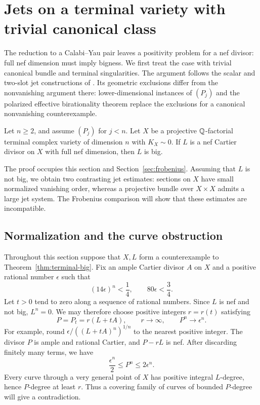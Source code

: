 \section{Jets on a terminal variety with trivial canonical class}
\label{sec:geometry}

The reduction to a Calabi--Yau pair leaves a positivity problem for a
nef divisor: full nef dimension must imply bigness. We first treat the
case with trivial canonical bundle and terminal singularities. The
argument follows the scalar and two-slot jet constructions of
\cite[Sections~7--8]{LA}. Its geometric exclusions differ from the
nonvanishing argument there: lower-dimensional instances of $(P_j)$
and the polarized effective birationality theorem replace the
exclusions for a canonical nonvanishing counterexample.

\begin{theorem}\label{thm:terminal-big}
Let $n\ge2$, and assume $(P_j)$ for $j<n$. Let $X$ be a projective
$\mathbb Q$-factorial terminal complex variety of dimension $n$ with
$K_X\sim0$. If $L$ is a nef Cartier divisor on $X$ with full nef
dimension, then $L$ is big.
\end{theorem}

The proof occupies this section and Section~\ref{sec:frobenius}.
Assuming that $L$ is not big, we obtain two contrasting jet estimates:
sections on $X$ have small normalized vanishing order, whereas a
projective bundle over $X\times X$ admits a large jet system. The
Frobenius comparison will show that these estimates are incompatible.

\subsection{Normalization and the curve obstruction}

Throughout this section suppose that $X,L$ form a counterexample to
Theorem~\ref{thm:terminal-big}. Fix an ample Cartier divisor $A$ on $X$
and a positive rational number $\epsilon$ such that
\begin{equation}\label{j:epsilon}
 (14\epsilon)^n<\frac14,
 \qquad 80\epsilon<\frac34.
\end{equation}
Let $t>0$ tend to zero along a sequence of rational numbers. Since
$L$ is nef and not big, $L^n=0$. We may therefore choose positive
integers $r=r(t)$ satisfying
\begin{equation}\label{eq:scaling}
 P=P_t=r(L+tA),\qquad
 r\longrightarrow\infty,\qquad P^n\longrightarrow\epsilon^n.
\end{equation}
For example, round $\epsilon/((L+tA)^n)^{1/n}$ to the nearest positive
integer. The divisor $P$ is ample and rational Cartier, and $P-rL$ is
nef. After discarding finitely many terms, we have
\begin{equation}\label{j:volume-window}
 \frac{\epsilon^n}{2}\le P^n\le2\epsilon^n.
\end{equation}
Every curve through a very general point of $X$ has positive integral
$L$-degree, hence $P$-degree at least $r$. Thus a covering family of
curves of bounded $P$-degree will give a contradiction.

